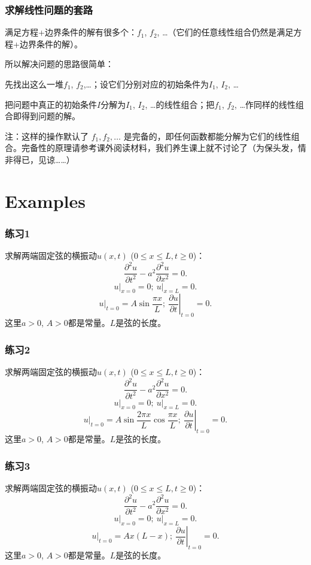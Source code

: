 \documentclass[CJK]{beamer}
\begin{document}
\begin{frame}
  \frametitle{求解线性问题的套路}

  满足方程+边界条件的解有很多个：$f_1$, $f_2$, \ldots （它们的任意线性组合仍然是满足方程+边界条件的解）。

  所以解决问题的思路很简单：

  \bitem
\item{先找出这么一堆$f_1$, $f_2$,\ldots；设它们分别对应的初始条件为$I_1$, $I_2$, \ldots}
\item{把问题中真正的初始条件$I$分解为$I_1$, $I_2$, \ldots 的线性组合；把$f_1$, $f_2$, \ldots 作同样的线性组合即得到问题的解。}
  \eitem

  \skiplines

  {\scriptsize 注：这样的操作默认了 $f_1,f_2,\ldots$ 是完备的，即任何函数都能分解为它们的线性组合。完备性的原理请参考课外阅读材料，我们养生课上就不讨论了（为保头发，情非得已，见谅……）}
\end{frame}

\section{Examples}

\begin{frame}
  \frametitle{练习1}
  求解两端固定弦的横振动$u(x, t)$ ($0\le x\le L, t\ge 0$)：
  $$\frac{\partial^2u}{\partial t^2} - a^2\frac{\partial^2u}{\partial x^2} = 0 .$$
  $$ \left.u\right\vert_{x=0} = 0;\ \left.u\right\vert_{x=L} = 0.$$
  $$ \left.u\right\vert_{t=0} = A\sin\frac{\pi x}{L};\ \left.\frac{\partial u}{\partial t}\right\vert_{t=0} = 0.$$
  这里$a>0$, $A>0$都是常量。$L$是弦的长度。
\end{frame}



\begin{frame}
  \frametitle{练习2}
  求解两端固定弦的横振动$u(x, t)$ ($0\le x\le L, t\ge 0$)：
  $$\frac{\partial^2u}{\partial t^2} - a^2\frac{\partial^2u}{\partial x^2} = 0 .$$
  $$ \left.u\right\vert_{x=0} = 0;\ \left.u\right\vert_{x=L} = 0.$$
  $$ \left.u\right\vert_{t=0} = A\sin\frac{2\pi x}{L}\cos\frac{\pi x}{L};\ \left.\frac{\partial u}{\partial t}\right\vert_{t=0} = 0.$$
  这里$a>0$, $A>0$都是常量。$L$是弦的长度。
\end{frame}


\begin{frame}
  \frametitle{练习3}
  求解两端固定弦的横振动$u(x, t)$ ($0\le x\le L, t\ge 0$)：
  $$\frac{\partial^2u}{\partial t^2} - a^2\frac{\partial^2u}{\partial x^2} = 0 .$$
  $$ \left.u\right\vert_{x=0} = 0;\ \left.u\right\vert_{x=L} = 0.$$
  $$ \left.u\right\vert_{t=0} = Ax(L-x);\ \left.\frac{\partial u}{\partial t}\right\vert_{t=0} = 0.$$
  这里$a>0$, $A>0$都是常量。$L$是弦的长度。
\end{frame}
\end{document}
